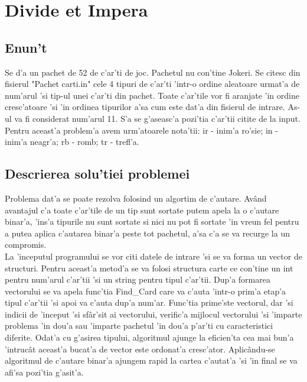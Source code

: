 \chapter{Divide et Impera}
\section{Enun't}
\myindent
Se d'a un pachet de 52 de c'ar'ti de joc. Pachetul nu con'tine Jokeri. Se citesc din fisierul "Pachet carti.in" cele 4 tipuri de c'ar'ti 'intr-o ordine aleatoare urmat'a de num'arul 'si tip-ul unei c'ar'ti din pachet. Toate c'ar'tile vor fi aranjate 'in ordine cresc'atoare 'si 'in ordinea tipurilor a'sa cum este dat'a din fisierul de intrare. As-ul va fi considerat num'arul 11. S'a se g'aseasc'a pozi'tia c'ar'tii citite de la input.
\newline
\newline
\myindent
Pentru aceast'a problem'a avem urm'atoarele nota'tii: ir - inim'a ro'sie; in - inim'a neagr'a; rb - romb; tr - trefl'a.
\vspace{15mm}

\section{Descrierea solu'tiei problemei}
\vspace{10mm}
\myindent
Problema dat'a se poate rezolva folosind un algortim de c'autare. Av\^and avantajul c'a toate c'ar'tile de un tip sunt sortate putem apela la o c'autare binar'a, 'ins'a tipurile nu sunt sortate si nici nu pot fi sortate 'in vreun fel pentru a putea aplica c'autarea binar'a peste tot pachetul, a'sa c'a se va recurge la un compromis.\\
\newline
\myindent
La 'inceputul programului se vor citi datele de intrare 'si se va forma un vector de structuri. Pentru aceast'a metod'a se va folosi structura carte ce con'tine un int pentru num'arul c'ar'tii 'si un string pentru tipul c'ar'tii. Dup'a formarea vectorului se va apela func'tia Find\_Card care va c'auta 'intr-o prim'a etap'a tipul c'ar'tii 'si apoi va c'auta dup'a num'ar. Func'tia prime'ste vectorul, dar 'si indicii de 'inceput 'si sf\^ar'sit ai vectorului, verific'a mijlocul vectorului 'si 'imparte problema 'in dou'a sau 'imparte pachetul 'in dou'a p'ar'ti cu caracteristici diferite. Odat'a cu g'asirea tipului, algoritmul ajunge la eficien'ta cea mai bun'a 'intruc\^at aceast'a bucat'a de vector este ordonat'a cresc'ator. Aplic\^andu-se algoritmul de c'autare binar'a ajungem rapid la cartea c'autat'a 'si 'in final se va afi'sa pozi'tia g'asit'a.


